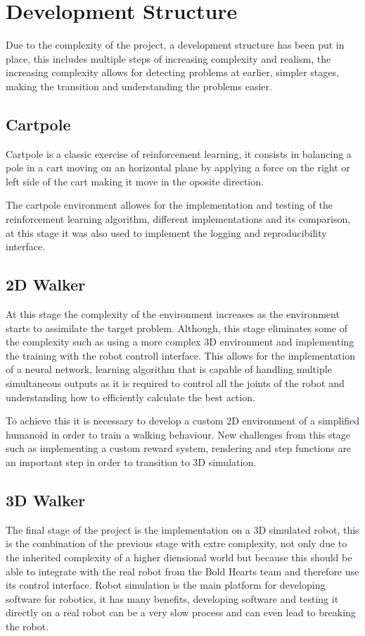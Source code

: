 \section{Development Structure}
Due to the complexity of the project, a development structure has been put in place, 
this includes multiple steps of increasing complexity and realism, 
the increasing complexity allows for detecting problems at earlier, simpler stages, making the transition and understanding the problems easier.
\subsection{Cartpole}
Cartpole is a classic exercise of reinforcement learning, it consists in balancing a pole in a cart moving on an horizontal plane by applying a force on the right or left side of the cart making it move in the oposite direction. 

The cartpole environment allowes for the implementation and testing of the reinforcement learning algorithm, different implementations and its comparison, at this stage it was also used to implement the logging and reproducibility interface.

\subsection{2D Walker}
At this stage the complexity of the environment increases as the environment starts to assimilate the target problem. Although, this stage eliminates some of the complexity such as using a more complex 3D environment and implementing the training with the robot controll interface.
This allows for the implementation of a neural network, learning algorithm that is capable of handling multiple simultaneous outputs as it is required to control all the joints of the robot and understanding how to efficiently calculate the best action.

To achieve this it is necessary to develop a custom 2D environment of a simplified humanoid in order to train a walking behaviour.
New challenges from this stage such as implementing a custom reward system, rendering and step functions are an important step in order to transition to 3D simulation.

\subsection{3D Walker}
The final stage of the project is the implementation on a 3D simulated robot, this is the combination of the previous stage with extre complexity, not only due to the inherited complexity of a higher diensional world but because this should be able to integrate with the real robot from the Bold Hearts team and therefore use its control interface.
Robot simulation is the main platform for developing software for robotics, it has many benefits, developing software and testing it directly on a real robot can be a very slow process and can even lead to breaking the robot.

